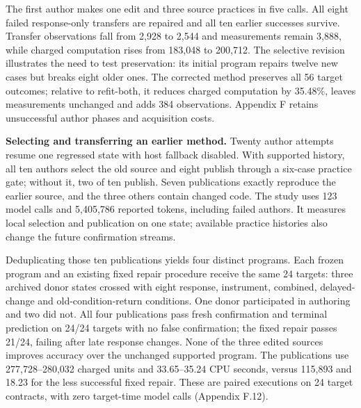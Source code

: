 \documentclass[twoside,11pt]{article}
\begin{document}
The first author makes one edit and three source practices in five calls. All eight failed response-only transfers are repaired and all ten earlier successes survive. Transfer observations fall from 2,928 to 2,544 and measurements remain 3,888, while charged computation rises from 183,048 to 200,712. The selective revision illustrates the need to test preservation: its initial program repairs twelve new cases but breaks eight older ones. The corrected method preserves all 56 target outcomes; relative to refit-both, it reduces charged computation by 35.48\%, leaves measurements unchanged and adds 384 observations. Appendix F retains unsuccessful author phases and acquisition costs.


\textbf{Selecting and transferring an earlier method.} Twenty author attempts resume one regressed state with host fallback disabled. With supported history, all ten authors select the old source and eight publish through a six-case practice gate; without it, two of ten publish. Seven publications exactly reproduce the earlier source, and the three others contain changed code. The study uses 123 model calls and 5,405,786 reported tokens, including failed authors. It measures local selection and publication on one state; available practice histories also change the future confirmation streams.


Deduplicating those ten publications yields four distinct programs. Each frozen program and an existing fixed repair procedure receive the same 24 targets: three archived donor states crossed with eight response, instrument, combined, delayed-change and old-condition-return conditions. One donor participated in authoring and two did not. All four publications pass fresh confirmation and terminal prediction on 24/24 targets with no false confirmation; the fixed repair passes 21/24, failing after late response changes. None of the three edited sources improves accuracy over the unchanged supported program. The publications use 277,728–280,032 charged units and 33.65–35.24 CPU seconds, versus 115,893 and 18.23 for the less successful fixed repair. These are paired executions on 24 target contracts, with zero target-time model calls (Appendix F.12).
\end{document}
